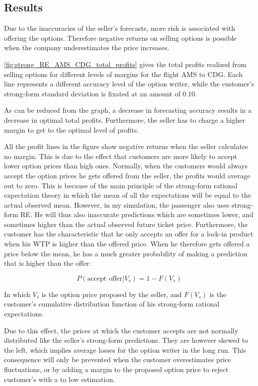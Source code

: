 

\subsection{Results}
Due to the inaccuracies of the seller's forecasts, more risk is associated with offering the options. Therefore negative returns on selling options is possible when the company underestimates the price increases.

\autoref{fig:strong_RE_AMS_CDG_total_profits} gives the total profits realized from selling options for different levels of margins for the flight AMS to CDG. Each line represents a different accuracy level of the option writer, while the customer's strong-form standard deviation is fixated at an amount of $0.10$.

As can be reduced from the graph, a decrease in forecasting accuracy results in a decrease in optimal total profits. Furthermore, the seller has to charge a higher margin to get to the optimal level of profits.

All the profit lines in the figure show negative returns when the seller calculates no margin. This is due to the effect that customers are more likely to accept lower option prices than high ones. Normally, when the customers would always accept the option prices he gets offered from the seller, the profits would average out to zero. This is because of the main principle of the strong-form rational expectation theory in which the mean of all the expectations will be equal to the actual observed mean. However, in my simulation, the passenger also uses strong-form RE. He will thus also inaccurate predictions which are sometimes lower, and sometimes higher than the actual observed future ticket price. Furthermore, the customer has the characteristic that he only accepts an offer for a lock-in product when his WTP is higher than the offered price. When he therefore gets offered a price below the mean, he has a much greater probability of making a prediction that is higher than the offer:

$$ P(\mbox{accept offer} | V_s)  = 1 - F(V_s)  $$

In which $V_s$ is the option price proposed by the seller, and $F(V_s)$ is the customer's cumulative distribution function of his strong-form rational expectations.

Due to this effect, the prices at which the customer accepts are not normally distributed like the seller's strong-form predictions. They are however skewed to the left, which implies average losses for the option writer in the long run. This consequence will only be prevented when the customer overestimates price fluctuations, or by adding a margin to the proposed option price to reject customer's with a to low estimation.

